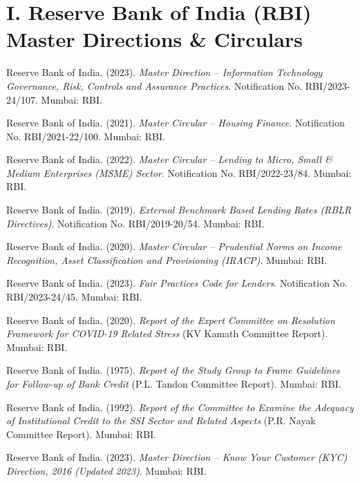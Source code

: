 \documentclass[11pt,a4paper,oneside]{report}
\begin{document}
\section*{I. Reserve Bank of India (RBI) Master Directions \& Circulars}
\begin{enumerate}[label={[\arabic*]}]
    \item Reserve Bank of India. (2023). \textit{Master Direction -- Information Technology Governance, Risk, Controls and Assurance Practices}. Notification No. RBI/2023-24/107. Mumbai: RBI.
    \item Reserve Bank of India. (2021). \textit{Master Circular -- Housing Finance}. Notification No. RBI/2021-22/100. Mumbai: RBI.
    \item Reserve Bank of India. (2022). \textit{Master Circular -- Lending to Micro, Small \& Medium Enterprises (MSME) Sector}. Notification No. RBI/2022-23/84. Mumbai: RBI.
    \item Reserve Bank of India. (2019). \textit{External Benchmark Based Lending Rates (RBLR Directives)}. Notification No. RBI/2019-20/54. Mumbai: RBI.
    \item Reserve Bank of India. (2020). \textit{Master Circular -- Prudential Norms on Income Recognition, Asset Classification and Provisioning (IRACP)}. Mumbai: RBI.
    \item Reserve Bank of India. (2023). \textit{Fair Practices Code for Lenders}. Notification No. RBI/2023-24/45. Mumbai: RBI.
    \item Reserve Bank of India. (2020). \textit{Report of the Expert Committee on Resolution Framework for COVID-19 Related Stress} (KV Kamath Committee Report). Mumbai: RBI.
    \item Reserve Bank of India. (1975). \textit{Report of the Study Group to Frame Guidelines for Follow-up of Bank Credit} (P.L. Tandon Committee Report). Mumbai: RBI.
    \item Reserve Bank of India. (1992). \textit{Report of the Committee to Examine the Adequacy of Institutional Credit to the SSI Sector and Related Aspects} (P.R. Nayak Committee Report). Mumbai: RBI.
    \item Reserve Bank of India. (2023). \textit{Master Direction -- Know Your Customer (KYC) Direction, 2016 (Updated 2023)}. Mumbai: RBI.
\end{enumerate}
\end{document}
